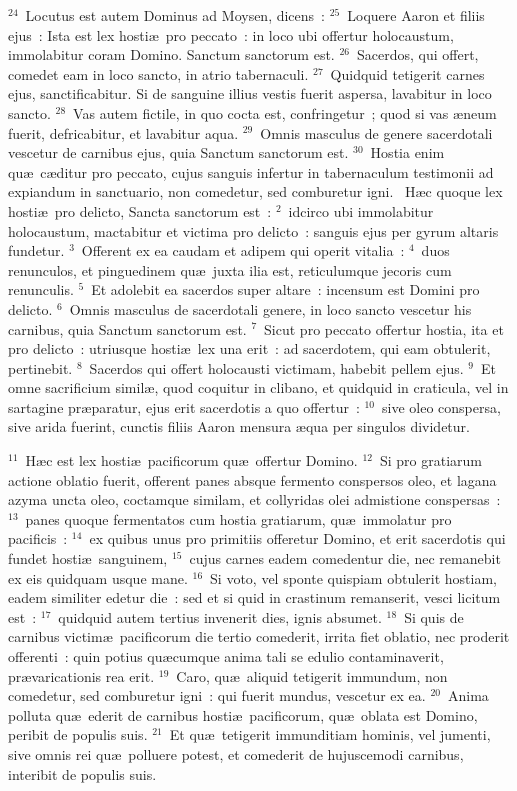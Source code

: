 ${}^{24}$~Locutus est autem Dominus ad Moysen, dicens~:
${}^{25}$~Loquere Aaron et filiis ejus~: Ista est lex hosti\ae\ pro peccato~: in loco ubi offertur holocaustum, immolabitur coram Domino. Sanctum sanctorum est.
${}^{26}$~Sacerdos, qui offert, comedet eam in loco sancto, in atrio tabernaculi.
${}^{27}$~Quidquid tetigerit carnes ejus, sanctificabitur. Si de sanguine illius vestis fuerit aspersa, lavabitur in loco sancto.
${}^{28}$~Vas autem fictile, in quo cocta est, confringetur~; quod si vas \ae neum fuerit, defricabitur, et lavabitur aqua.
${}^{29}$~Omnis masculus de genere sacerdotali vescetur de carnibus ejus, quia Sanctum sanctorum est.
${}^{30}$~Hostia enim qu\ae\ c\ae ditur pro peccato, cujus sanguis infertur in tabernaculum testimonii ad expiandum in sanctuario, non comedetur, sed comburetur igni.
~H\ae c quoque lex hosti\ae\ pro delicto, Sancta sanctorum est~:
${}^{2}$~idcirco ubi immolabitur holocaustum, mactabitur et victima pro delicto~: sanguis ejus per gyrum altaris fundetur.
${}^{3}$~Offerent ex ea caudam et adipem qui operit vitalia~:
${}^{4}$~duos renunculos, et pinguedinem qu\ae\ juxta ilia est, reticulumque jecoris cum renunculis.
${}^{5}$~Et adolebit ea sacerdos super altare~: incensum est Domini pro delicto.
${}^{6}$~Omnis masculus de sacerdotali genere, in loco sancto vescetur his carnibus, quia Sanctum sanctorum est.
${}^{7}$~Sicut pro peccato offertur hostia, ita et pro delicto~: utriusque hosti\ae\ lex una erit~: ad sacerdotem, qui eam obtulerit, pertinebit.
${}^{8}$~Sacerdos qui offert holocausti victimam, habebit pellem ejus.
${}^{9}$~Et omne sacrificium simil\ae , quod coquitur in clibano, et quidquid in craticula, vel in sartagine pr\ae paratur, ejus erit sacerdotis a quo offertur~:
${}^{10}$~sive oleo conspersa, sive arida fuerint, cunctis filiis Aaron mensura \ae qua per singulos dividetur.


${}^{11}$~H\ae c est lex hosti\ae\ pacificorum qu\ae\ offertur Domino.
${}^{12}$~Si pro gratiarum actione oblatio fuerit, offerent panes absque fermento conspersos oleo, et lagana azyma uncta oleo, coctamque similam, et collyridas olei admistione conspersas~:
${}^{13}$~panes quoque fermentatos cum hostia gratiarum, qu\ae\ immolatur pro pacificis~:
${}^{14}$~ex quibus unus pro primitiis offeretur Domino, et erit sacerdotis qui fundet hosti\ae\ sanguinem,
${}^{15}$~cujus carnes eadem comedentur die, nec remanebit ex eis quidquam usque mane.
${}^{16}$~Si voto, vel sponte quispiam obtulerit hostiam, eadem similiter edetur die~: sed et si quid in crastinum remanserit, vesci licitum est~:
${}^{17}$~quidquid autem tertius invenerit dies, ignis absumet.
${}^{18}$~Si quis de carnibus victim\ae\ pacificorum die tertio comederit, irrita fiet oblatio, nec proderit offerenti~: quin potius qu\ae cumque anima tali se edulio contaminaverit, pr\ae varicationis rea erit.
${}^{19}$~Caro, qu\ae\ aliquid tetigerit immundum, non comedetur, sed comburetur igni~: qui fuerit mundus, vescetur ex ea.
${}^{20}$~Anima polluta qu\ae\ ederit de carnibus hosti\ae\ pacificorum, qu\ae\ oblata est Domino, peribit de populis suis.
${}^{21}$~Et qu\ae\ tetigerit immunditiam hominis, vel jumenti, sive omnis rei qu\ae\ polluere potest, et comederit de hujuscemodi carnibus, interibit de populis suis.



